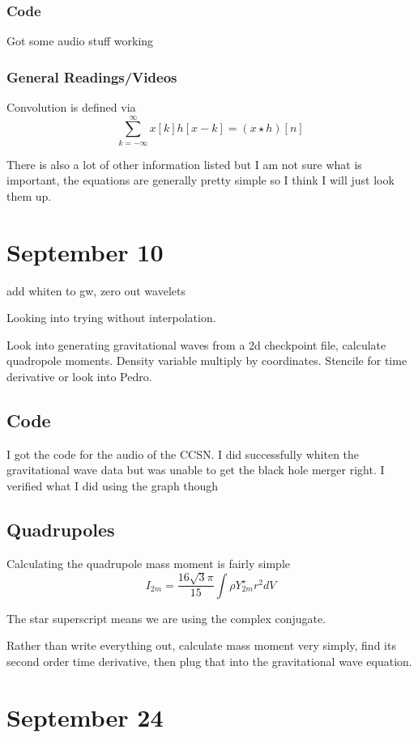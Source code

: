 \subsubsection{Code}

Got some audio stuff working

\subsubsection{General Readings/Videos}

Convolution is defined via
\[
	\sum_{k=-\infty}^\infty x[k]h[x-k] = (x \star h)[n]
\]

There is also a lot of other information listed but I am not sure what is important, the equations are generally pretty simple so I think I will just look them up.
\section{September 10}

add whiten to gw, zero out wavelets

Looking into trying without interpolation.

Look into generating gravitational waves from a 2d checkpoint file, calculate quadropole moments. Density variable multiply by coordinates. Stencile for time derivative or look into Pedro.

\subsection{Code}

I got the code for the audio of the CCSN. I did successfully whiten the gravitational wave data but was unable to get the black hole merger right. I verified what I did using the graph though

\subsection{Quadrupoles}

Calculating the quadrupole mass moment is fairly simple
\[
	I_{2m} = \frac{16 \sqrt{3} \pi}{15} \int \rho Y_{2m}^{\star} r^2 dV
\]

The star superscript means we are using the complex conjugate.


Rather than write everything out, calculate mass moment very simply, find its second order time derivative, then plug that into the gravitational wave equation.

\section{September 24}



